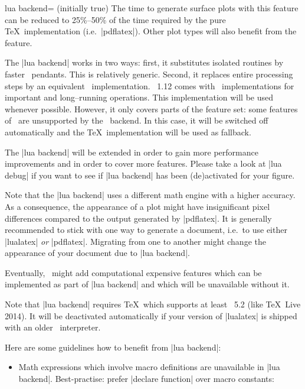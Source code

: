 {\begin{pgfplotskey}{lua backend= (initially true)}
	The time to generate surface plots with this feature can be reduced to 25\%--50\% of the time required by the pure \TeX\ implementation (i.e.\ |pdflatex|). Other plot types will also benefit from the feature.

	The |lua backend| works in two ways: first, it substitutes isolated routines by faster \lua\ pendants. This is relatively generic. Second, it replaces entire processing steps by an equivalent \lua\ implementation. \PGFPlots\ 1.12 comes with \lua\ implementations for important and long--running operations. This implementation will be used whenever possible. However, it only covers parts of the feature set: some features of \PGFPlots\ are unsupported by the \lua\ backend. In this case, it will be switched off automatically and the \TeX\ implementation will be used as fallback.

	The |lua backend| will be extended in order to gain more performance improvements and in order to cover more features. Please take a look at |lua debug| if you want to see if |lua backend| has been (de)activated for your figure.

	Note that the |lua backend| uses a different math engine with a higher accuracy. As a consequence, the appearance of a plot might have insignificant pixel differences compared to the output generated by |pdflatex|. It is generally recommended to stick with one way to generate a document, i.e.\ to use either |lualatex| \emph{or} |pdflatex|. Migrating from one to another might change the appearance of your document due to |lua backend|.

	Eventually, \PGFPlots\ might add computational expensive features which can be implemented as part of |lua backend| and which will be unavailable without it.

	Note that |lua backend| requires \TeX\ which supports at least \lua~5.2 (like \TeX\ Live 2014). It will be deactivated automatically if your version of |lualatex| is shipped with an older \lua\ interpreter.

	Here are some guidelines how to benefit from |lua backend|:
	\begin{itemize}
		\item Math expressions which involve macro definitions are unavailable in |lua backend|. Best-practise: prefer |declare function| over macro constants:
\begin{codeexample}[]
\end{codeexample}
\begin{codeexample}[]
\end{codeexample}


\end{itemize}
\end{pgfplotskey}}
